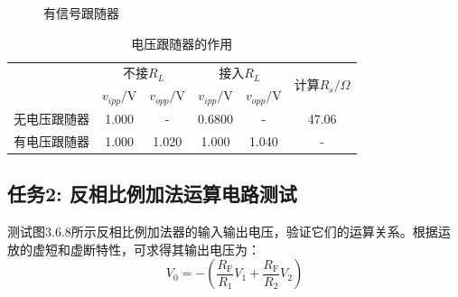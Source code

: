 \documentclass[a4paper,11pt,UTF8]{article}
\begin{document}
\begin{figure}[H]
	\centering
	\setcounter{subfigure}{0}
	
	\caption*{有信号跟随器}
\end{figure}

\begin{table}[h]
	\centering
	\caption*{电压跟随器的作用}

	\begin{tabular}{|c|c|c|c|c|c|}
		\hline
		\multirow{2}{*}{}   & \multicolumn{2}{c|}{不接$R_L$} & \multicolumn{2}{c|}{接入$R_L$} &
		\multirow{2}{*}{计算$R_s/\Omega$}\\
		\cline{2-5}
		\multirow{2}{*}{} & $v_{ipp}/$V & $v_{opp}/$V & $v_{ipp}/$V & $v_{opp}/$V & \multirow{2}{*}{}\\
		\hline
		无电压跟随器 & 1.000 & - & 0.6800 & - & 47.06\\
		\hline
		有电压跟随器 & 1.000 & 1.020 & 1.000 & 1.040 & - \\
		\hline
	\end{tabular}
	\label{table_MAP}
\end{table}



\subsection{任务2: 反相比例加法运算电路测试}
测试图3.6.8所示反相比例加法器的输入输出电压，验证它们的运算关系。根据运放的虚短和虚断特性，可求得其输出电压为：
$$
	V_0=-\left(\frac{R_{\mathrm{F}}}{R_1}V_1+\frac{R_{\mathrm{F}}}{R_2}V_2\right)
$$
\end{document}
